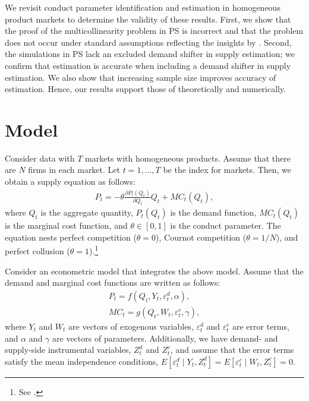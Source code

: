 \documentclass[11pt, a4paper]{article}
\begin{document}
We revisit conduct parameter identification and estimation in homogeneous product markets to determine the validity of these results.
First, we show that the proof of the multicollinearity problem in PS is incorrect and that the problem does not occur under standard assumptions reflecting the insights by \citet{bresnahan1982oligopoly}.
Second, the simulations in PS lack an excluded demand shifter in supply estimation; we confirm that estimation is accurate when including a demand shifter in supply estimation. 
We also show that increasing sample size improves accuracy of estimation. 
Hence, our results support those of \cite{bresnahan1982oligopoly} theoretically and numerically.

\section{Model}
Consider data with $T$ markets with homogeneous products.
Assume that there are $N$ firms in each market.
Let $t = 1,\ldots, T$ be the index for markets.
Then, we obtain a supply equation as follows:
\begin{align}
     P_t = -\theta\frac{\partial P_t(Q_{t})}{\partial Q_{t}}Q_{t} + MC_t(Q_{t}),\label{eq:supply_equation}
\end{align}
where $Q_{t}$ is the aggregate quantity, $P_t(Q_{t})$ is the demand function, $MC_{t}(Q_{t})$ is the marginal cost function, and $\theta\in[0,1]$ is  the conduct parameter. 
The equation nests perfect competition ($\theta=0$), Cournot competition ($\theta=1/N$), and perfect collusion ($\theta=1$).\footnote{See \cite{bresnahan1982oligopoly}.} 

Consider an econometric model that integrates the above model.
Assume that the demand and marginal cost functions are written as follows: 
\begin{align}
    P_t = f(Q_{t}, Y_t, \varepsilon^{d}_{t}, \alpha), \label{eq:demand}\\
    MC_t = g(Q_{t}, W_{t}, \varepsilon^{c}_{t}, \gamma),\label{eq:marginal_cost}
\end{align}
where $Y_t$ and $W_{t}$ are vectors of exogenous variables, $\varepsilon^{d}_{t}$ and $\varepsilon^{c}_{t}$ are error terms, and $\alpha$ and $\gamma$ are vectors of parameters.
Additionally, we have demand- and supply-side instrumental variables, $Z^{d}_{t}$ and $Z^{c}_{t}$, and assume that the error terms satisfy the mean independence conditions, $E[\varepsilon^{d}_{t}\mid Y_t, Z^{d}_{t}] = E[\varepsilon^{c}_{t} \mid W_{t}, Z^{c}_{t}] =0$.
\end{document}
